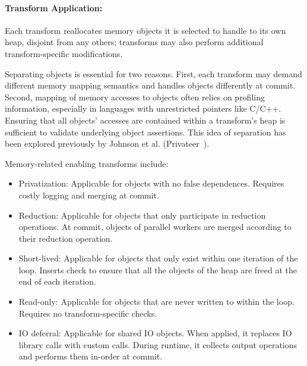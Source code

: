 \paragraph{Transform Application:}
Each transform reallocates
memory objects it is selected to handle
to its own heap, disjoint from any others; transforms may also
perform additional transform-specific modifications.

Separating objects is essential
for two reasons. First, each transform may demand different
memory mapping semantics and handles objects differently at commit.
Second, mapping of memory accesses to
objects often relies on profiling information, especially in languages with
unrestricted pointers like C/C++. Ensuring that all objects' accesses
are contained within a transform's heap is sufficient to
validate underlying object assertions. This idea of separation has
been explored previously by Johnson et al. (Privateer~\cite{johnson:12:pldi}).

Memory-related enabling transforms include:

\begin{itemize}
%
  \item Privatization: Applicable for objects with no false dependences.
  Requires costly logging and merging at commit.

\item Reduction: Applicable for objects that only participate in
reduction operations. At commit, objects of parallel
workers are merged according to their reduction operation.




\item Short-lived: Applicable for objects that only exist within one
iteration of the loop. Inserts check to ensure that all
the objects of the heap are freed at the end of each iteration.

\item Read-only: Applicable for objects that are never written to within
the loop. Requires no transform-specific checks.

\item IO deferral: Applicable for shared IO objects. When applied, it
replaces IO library calls with custom calls. During runtime, it
collects output operations and performs them in-order at commit.

\end{itemize}

